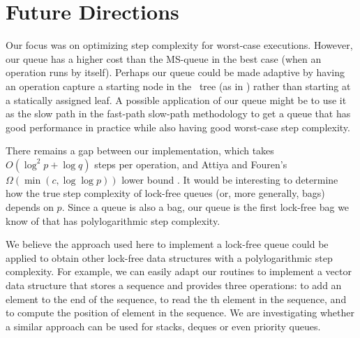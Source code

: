 
\section{Future Directions}

Our focus was on optimizing step complexity for worst-case executions.
However, our queue has a higher cost than the MS-queue in the best case (when an operation
runs by itself).
Perhaps our queue could be made adaptive by having an operation capture a starting node
in the \ordering\ tree (as in \cite{DBLP:conf/stoc/AfekDT95}) rather than starting at a statically assigned leaf.
A possible application of our queue  might be to use it as the slow path in the
fast-path slow-path methodology  \cite{10.1145/2370036.2145835} to
get a queue that has good performance in practice while also having good worst-case step complexity.

There remains a gap between our implementation, which takes $O(\log^2 p + \log q)$ steps per operation,
and Attiya and Fouren's $\Omega(\min(c,\log\log p))$ lower bound \cite{DBLP:conf/opodis/AttiyaF17}.
It would be interesting to determine how the true step complexity of lock-free queues (or, more generally, bags)
depends on $p$.
Since a queue is also a bag, our queue is the first lock-free bag we know of that has polylogarithmic step complexity.

We believe the approach used here to implement a lock-free queue 
could be applied to obtain other lock-free
data structures with a polylogarithmic step complexity.
For example, we can easily adapt our routines to implement a  vector data structure that stores a sequence and
provides three operations:  to add an element  to the end of the sequence,
 to read the th element in the sequence, and
 to compute the position of element  in the sequence.
We are investigating whether a similar approach can be used for stacks, deques or even priority queues.

